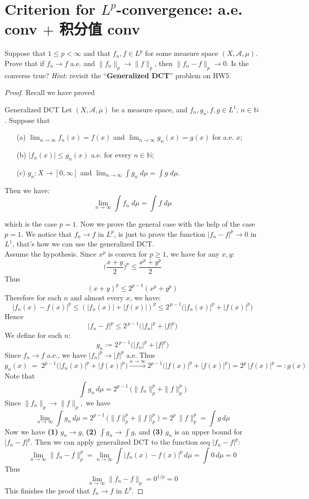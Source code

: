 \documentclass[lang=cn,11pt]{elegantbook}
\begin{document}
\section{Criterion for $L^p$-convergence: a.e. conv $+$ 积分值 conv}
  Suppose that $1\le p<\infty$ and that $f_n,f\in L^p$ for some measure space $(X,\mathcal{A},\mu)$.
  Prove that if $f_n\to f$ a.e. and $\|f_n\|_p\to\|f\|_p$, then $\|f_n-f\|_p\to0$. Is the converse true?
  \textit{Hint}: revisit the ``\textbf{Generalized DCT}'' problem on HW5.
  \begin{proof}
Recall we have proved 
\begin{theorem}{Generalized DCT}
    Let $(X, \mathcal{A}, \mu)$ be a measure space, and $f_n, g_n, f, g\in L^1$, $n\in \mathbb{N}$. Suppose that 
  \begin{itemize}
  \item[(a)]$\lim_{n\to\infty} f_n(x)=f(x)$ and $ \lim_{n\to\infty} g_n(x)=g(x)$ for a.e. $x$;
  \item[(b)] $|f_n(x)|\le g_n(x)$ a.e. for every $n\in \mathbb{N}$;
  \item[(c)]$g_n\colon X\to [0, \infty]$ and $\lim_{n\to \infty} \int g_n \; d \mu = \int g\; d\mu$.
  \end{itemize}
Then we have: \[
    \lim_{n\to \infty} \int f_n \; d\mu = \int f \; d\mu
  \]
\end{theorem}
which is the case $p=1$. Now we prove the general case with the help of the case $p=1$. We notice that $f_n \to f$ in $L^p$, is just to prove the function $|f_n -f |^p \to 0$ in $L^1$, that's how we can use the generalized DCT.\\
Assume the hypothesis. 
Since $x^p$ is convex for $p \geq 1$, we have for any $x,y$: \[
\bigg(\frac{x+y}{2} \bigg)^p \leq \frac{x^p + y^p}{2}
\]
Thus  \[
(x+y)^p \leq 2^{p-1} (x^p + y^p)
\]
Therefore for each \(n\) and almost every \(x\), we have: \[
     |f_n(x) - f(x)|^p  \leq (|f_n(x)| +| f(x)| ) ^p
  \le 2^{\,p-1}\bigl(\lvert f_n(x)\rvert^p + \lvert f(x)\rvert^p\bigr)
   \]
Hence \[
     |f_n - f|^p  \leq 2^{\,p-1}\bigl(|f_n|^p + |f|^p\bigr)
   \]
We define for each $n$: \[
 g_n := 2^{\,p-1}\bigl(|f_n|^p + |f|^p\bigr)
\]
Since \(f_n \to f\) a.e., we have \(|f_n|^p \to |f|^p\) a.e. Thus \[
     g_n(x)\;=\;2^{p-1}\bigl(|f_n(x)|^p + |f(x)|^p\bigr)\overset{n\to \infty}{\longrightarrow}
     2^{p-1}\bigl(|f(x)|^p + |f(x)|^p\bigr) =2^p\,|f(x)|^p
=:g(x)
   \]Note that \[
     \int g_n \, d\mu   =
     2^{p-1}\,\bigl(\|f_n\|_p^p + \|f\|_p^p\bigr)
   \]
Since \(\lVert f_n\rVert_p \to \lVert f\rVert_p,\) we have \[
\lim_{n\to \infty}     \int g_n\, d\mu = 
     2^{p-1}\,\bigl(\|f\|_p^p + \|f\|_p^p\bigr) = 
     2^p\,\|f\|_p^p  =\int g\,d\mu
   \]
Now we have \textbf{(1)} $g_n \to g$, \textbf{(2) }$\int g_n \to \int g$, and \textbf{(3)} $g_n$ is an upper bound for $    |f_n - f|^p$. Then we can apply generalized DCT to the function seq $    |f_n - f|^p$:
\[
\lim_{n\to \infty} \|f_n - f\|_p^p =  \lim_{n\to \infty}  \int\bigl|f_n(x)-f(x)\bigr|^p \,d\mu = 
  \int 0 \,d\mu = 0
\]
Thus
\[
\lim_{n\to \infty}   \|f_n - f\|_p = 0^{1/p} = 0
\]
This finishes the proof that \(f_n \to f\) in \(L^p\).
\end{proof}
\end{document}

